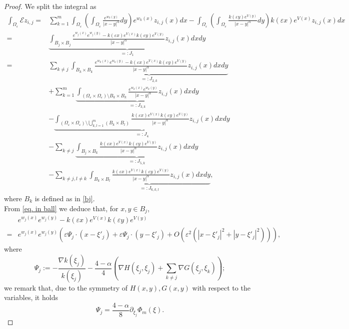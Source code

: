 \documentclass[10pt,a4paper]{amsart}
\begin{document}
\begin{proof}
We split the integral as
\begin{align*}
\int_{\Omega_\varepsilon}\mathcal Ez_{i,j}=&\sum_{k=1}^m\int_{\Omega_\varepsilon}\left(\int_{\Omega_\varepsilon}\frac{e^{w_k(y)}}{|x-y|^\alpha}dy\right)e^{w_k(x)}z_{i,j}(x)dx-\int_{\Omega_\varepsilon}\left(\int_{\Omega_\varepsilon}\frac{k(\varepsilon y)e^{V(y)}}{|x-y|^\alpha}dy\right)k(\varepsilon x)e^{V(x)}z_{i,j}(x)dx\\
=&\underbrace{\int_{B_j\times B_j}\frac{e^{w_j(x)}e^{w_j(y)}-k(\varepsilon x)e^{V(x)}k(\varepsilon y)e^{V(y)}}{|x-y|^\alpha}z_{i,j}(x)dxdy}_{=:J_1}\\
=&\sum_{k\ne j}\underbrace{\int_{B_k\times B_k}\frac{e^{w_k(x)}e^{w_k(y)}-k(\varepsilon x)e^{V(x)}k(\varepsilon y)e^{V(y)}}{|x-y|^\alpha}z_{i,j}(x)dxdy}_{=:J_{2,k}}\\
&+\sum_{k=1}^m\underbrace{\int_{(\Omega_\varepsilon\times\Omega_\varepsilon)\setminus B_k\times B_k}\frac{e^{w_k(x)}e^{w_k(y)}}{|x-y|^\alpha}z_{i,j}(x)dxdy}_{=:J_{3,k}}\\
&-\underbrace{\int_{(\Omega_\varepsilon\times\Omega_\varepsilon)\setminus\bigcup_{k,l=1}^m(B_k\times B_l)}\frac{k(\varepsilon x)e^{V(x)}k(\varepsilon y)e^{V(y)}}{|x-y|^\alpha}z_{i,j}(x)dxdy}_{=:J_4}\\
&-\sum_{k\ne j}\underbrace{\int_{B_j\times B_k}\frac{k(\varepsilon x)e^{V(x)}k(\varepsilon y)e^{V(y)}}{|x-y|^\alpha}z_{i,j}(x)dxdy}_{=:J_{5,k}}\\
&-\sum_{k\ne j,l\ne k}\underbrace{\int_{B_k\times B_l}\frac{k(\varepsilon x)e^{V(x)}k(\varepsilon y)e^{V(y)}}{|x-y|^\alpha}z_{i,j}(x)dxdy}_{=:J_{6,k,l}},	
\end{align*}
where $B_k$ is defined as in \eqref{bj}.\\
From \eqref{eq. in ball} we deduce that, for $x,y\in B_j$,
\begin{align*}
&e^{w_j(x)}e^{w_j(y)}-k(\varepsilon x)e^{V(x)}k(\varepsilon y)e^{V(y)}\\
=&e^{w_j(x)}e^{w_j(y)}\left(\varepsilon\Psi_j\cdot\left(x-\xi'_j\right)+\varepsilon\Psi_j\cdot\left(y-\xi'_j\right)+O\left(\varepsilon^2\left(\left|x-\xi'_j\right|^2+\left|y-\xi'_j\right|^2\right)\right)\right),
\end{align*}
where
$$\Psi_j:=-\frac{\nabla k(\xi_j)}{k\left(\xi_j\right)}-\frac{4-\alpha}4\left(\nabla H(\xi_j,\xi_j)+\sum_{k\ne j}\nabla G(\xi_j,\xi_k)\right);$$
we remark that, due to the symmetry of $H(x,y),G(x,y)$ with respect to the variables, it holds
$$\Psi_j=\frac{4-\alpha}8\partial_{\xi_j}\Phi_m(\xi).$$

\end{proof}
\end{document}
